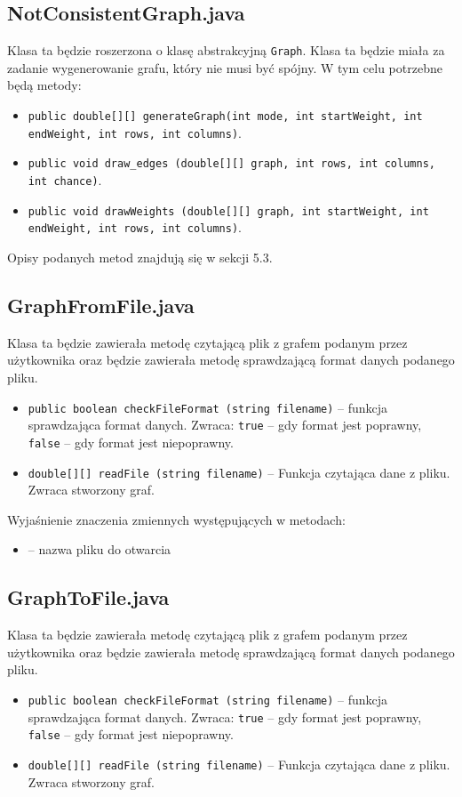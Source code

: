 \documentclass[12pt, a4paper]{article}
\begin{document}
\subsection{NotConsistentGraph.java}
Klasa ta będzie roszerzona o klasę abstrakcyjną \texttt{Graph}. Klasa ta będzie miała za zadanie wygenerowanie grafu, który nie musi być spójny.
W tym celu potrzebne będą metody:

\begin{itemize}
    \item \texttt{public double[][] generateGraph(int mode, int startWeight, int endWeight, int rows, int columns)}.
    \item \texttt{public void draw\_edges (double[][] graph, int rows, int columns, int chance)}.
    \item \texttt{public void drawWeights (double[][] graph, int startWeight, int endWeight, int rows, int columns)}.
\end{itemize}
Opisy podanych metod znajdują się w sekcji 5.3.

\subsection{GraphFromFile.java}
Klasa ta będzie zawierała metodę czytającą plik z grafem podanym przez użytkownika oraz będzie zawierała metodę sprawdzającą format danych podanego pliku. \\
\begin{itemize}
    \item \texttt{public boolean checkFileFormat (string filename)} -- funkcja sprawdzająca format danych. Zwraca: \texttt{true} -- gdy format jest poprawny, \texttt{false} -- gdy format jest niepoprawny.
    \item \texttt{double[][] readFile (string filename)} -- Funkcja czytająca dane z pliku. Zwraca stworzony graf.
\end{itemize}

Wyjaśnienie znaczenia zmiennych występujących w metodach:
\begin{itemize}
    \item {} -- nazwa pliku do otwarcia 
\end{itemize}

\subsection{GraphToFile.java}
Klasa ta będzie zawierała metodę czytającą plik z grafem podanym przez użytkownika oraz będzie zawierała metodę sprawdzającą format danych podanego pliku. \\
\begin{itemize}
    \item \texttt{public boolean checkFileFormat (string filename)} -- funkcja sprawdzająca format danych. Zwraca: \texttt{true} -- gdy format jest poprawny, \texttt{false} -- gdy format jest niepoprawny.
    \item \texttt{double[][] readFile (string filename)} -- Funkcja czytająca dane z pliku. Zwraca stworzony graf.
\end{itemize}
\end{document}
